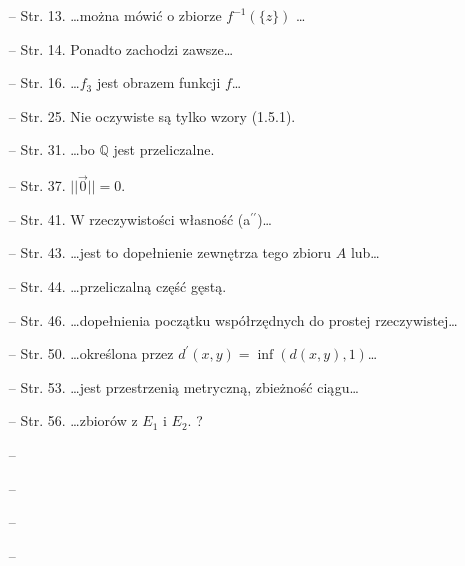 \documentclass[a4paper,11pt]{article}
\begin{document}
\begin{itemize}
\item[--] Str. 13. \ldots można mówić o zbiorze $f^{-1}(\{z\})$ \ldots
\item[--] Str. 14. Ponadto zachodzi zawsze\ldots
\item[--] Str. 16. \ldots $f_{3}$ jest obrazem funkcji $f$\ldots
\item[--] Str. 25. Nie oczywiste są tylko wzory (1.5.1).
\item[--] Str. 31. \ldots bo $\mathbb{Q}$ jest przeliczalne.
\item[--] Str. 37. $||\vec{0}||=0$.
\item[--] Str. 41. W rzeczywistości własność (a$^{\prime\prime}$)\ldots
\item[--] Str. 43. \ldots jest to dopełnienie zewnętrza tego zbioru $A$ lub\ldots
\item[--] Str. 44. \ldots przeliczalną część gęstą.
\item[--] Str. 46. \ldots dopełnienia początku współrzędnych do prostej rzeczywistej\ldots
\item[--] Str. 50. \ldots określona przez $d^{\prime} (x,y)=\inf(d(x,y),1)$\ldots
\item[--] Str. 53. \ldots jest przestrzenią metryczną, zbieżność ciągu\ldots
\item[--] Str. 56. \ldots zbiorów z $E_{1}$ i $E_{2}$. ?
\item[--]
\item[--]
\item[--]
\item[--]
\end{itemize}
\end{document}
